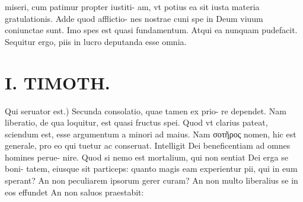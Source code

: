 \documentclass{article}
\begin{document}
\begin{pages}
miseri, cum patimur propter iustiti- am, vt potius ea sit iusta materia gratulationis. Adde quod afflictio- nes nostrae cuni spe in Deum viuum coniunctae sunt. Imo spes est quasi fundamentum. Atqui ea nunquam pudefacit. Sequitur ergo, piis in lucro deputanda esse omnia.  \pend
\section*{I. TIMOTH. }
\marginpar{[ p.52 ]}\pstart Qui seruator est.) Secunda consolatio, quae tamen ex prio- re dependet. Nam liberatio, de qua loquitur, est quasi fructus spei. Quod vt clarius pateat, sciendum est, esse argumentum a minori ad maius. Nam σοτῆρος nomen, hic est generale, pro eo qui tuetur ac conseruat. Intelligit Dei beneficentiam ad omnes homines perue- nire. Quod si nemo est mortalium, qui non sentiat Dei erga se boni- tatem, eiusque sit particeps: quanto magis eam experientur pii, qui in eum sperant? An non peculiarem ipsorum gerer curam? An non multo liberalius se in eos effundet An non saluos praestabit:  \pend
{}
{}

\end{pages}
\end{document}

